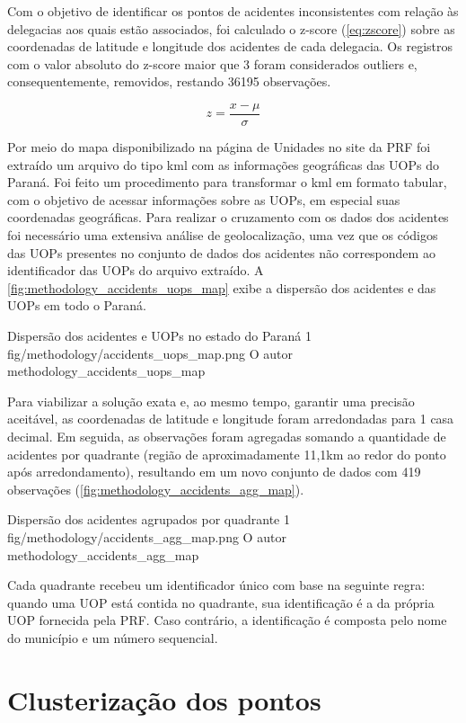 Com o objetivo de identificar os pontos de acidentes inconsistentes com relação às delegacias aos quais estão associados, foi calculado o z-score (\autoref{eq:zscore}) sobre as coordenadas de latitude e longitude dos acidentes de cada delegacia. Os registros com o valor absoluto do z-score maior que 3 foram considerados outliers e, consequentemente, removidos, restando 36195 observações. 

\begin{equation} \label{eq:zscore}
z = \dfrac{x - \mu}{\sigma}
\end{equation}

Por meio do mapa disponibilizado na página de Unidades no site da PRF \cite{UnidadesPRF} foi extraído um arquivo do tipo kml com as informações geográficas das UOPs do Paraná. Foi feito um procedimento para transformar o kml em formato tabular, com o objetivo de acessar informações sobre as UOPs, em especial suas coordenadas geográficas. Para realizar o cruzamento com os dados dos acidentes foi necessário uma extensiva análise de geolocalização, uma vez que os códigos das UOPs presentes no conjunto de dados dos acidentes não correspondem ao identificador das UOPs do arquivo extraído. A \autoref{fig:methodology_accidents_uops_map} exibe a dispersão dos acidentes e das UOPs em todo o Paraná.

\figurah
{Dispersão dos acidentes e UOPs no estado do Paraná}
{1}
{fig/methodology/accidents_uops_map.png}
{O autor}
{methodology_accidents_uops_map}
{}
{}

Para viabilizar a solução exata e, ao mesmo tempo, garantir uma precisão aceitável, as coordenadas de latitude e longitude foram arredondadas para 1 casa decimal. Em seguida, as observações foram agregadas somando a quantidade de acidentes por quadrante (região de aproximadamente 11,1km ao redor do ponto após arredondamento), resultando em um novo conjunto de dados com 419 observações (\autoref{fig:methodology_accidents_agg_map}). 

\figurah
{Dispersão dos acidentes agrupados por quadrante}
{1}
{fig/methodology/accidents_agg_map.png}
{O autor}
{methodology_accidents_agg_map}
{}
{}

Cada quadrante recebeu um identificador único com base na seguinte regra: quando uma UOP está contida no quadrante, sua identificação é a da própria UOP fornecida pela PRF. Caso contrário, a identificação é composta pelo nome do município e um número sequencial.

\section{Clusterização dos pontos} \label{sec:clustering}


